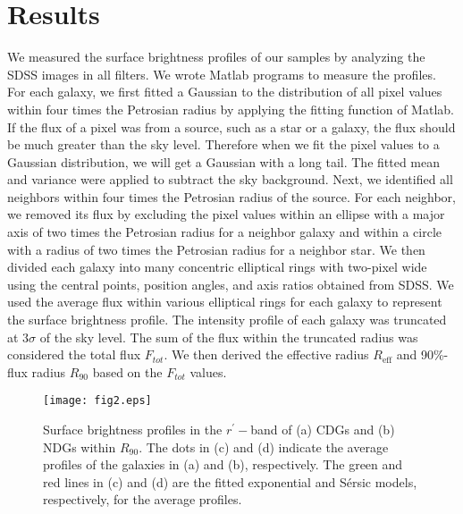 \documentclass[fleqn,usenatbib]{mnras}
\begin{document}
\section{Results}
We measured the surface brightness profiles of our samples by analyzing the SDSS images in all filters.
We wrote Matlab programs to measure the profiles. 
For each galaxy, we first fitted a Gaussian to the distribution of all pixel values within four times the Petrosian radius by applying the fitting function of Matlab.
If the flux of a pixel was from a source, such as a star or a galaxy, the flux should be much greater than the sky level.
Therefore when we fit the pixel values to a Gaussian distribution, we will get a Gaussian with a long tail.
The fitted mean and variance were applied to subtract the sky background.
Next, we identified all neighbors within four times the Petrosian radius of the source.
For each neighbor, we removed its flux by excluding the pixel values within an ellipse with a major axis of two times the Petrosian radius for a neighbor galaxy and within a circle with a radius of two times the Petrosian radius for a neighbor star.
We then divided each galaxy into many concentric elliptical rings with two-pixel wide using the central points, position angles, and axis ratios obtained from SDSS.
We used the average flux within various elliptical rings for each galaxy to represent the surface brightness profile.
The intensity profile of each galaxy was truncated at $3\sigma$ of the sky level.
The sum of the flux within the truncated radius was considered the total flux $F_{tot}$.
We then derived the effective radius $R_\mathrm{eff}$ and 90\%-flux radius $R_{90}$ based on the $F_{tot}$ values.

\begin{figure}
        \texttt{[image: fig2.eps]}
    \caption{Surface brightness profiles in the $r^{\prime}-$band of (a) CDGs and (b) NDGs within $R_{90}$. The dots in (c) and (d) indicate the average profiles of the galaxies in (a) and (b), respectively. The green and red lines in (c) and (d) are the fitted exponential and S{\'e}rsic models, respectively, for the average profiles.}
    \label{fig2}
\end{figure}
\end{document}
